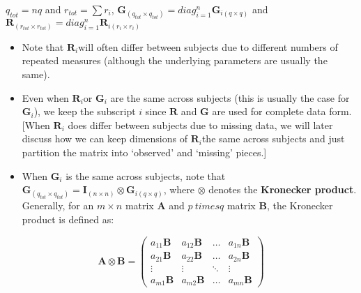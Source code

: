\documentclass[
  9pt,
  ignorenonframetext,
]{beamer}
\begin{document}
\begin{frame}{}
\(q_{tot} = nq\) and \(r_{tot} = \sum r_i\),
\(\pmb G_{(q_{tot} \times q_{tot})} = diag_{i=1}^n \pmb G_{i (q \times q)}\)
and
\(\pmb R_{(r_{tot} \times r_{tot})} = diag_{i=1}^n \pmb R_{i (r_i \times r_i)}\)
\end{frame}

\begin{frame}{}
\protect\hypertarget{section-3}{}
\begin{itemize}
\item
  Note that \(\pmb R_i\)will often differ between subjects due to
  different numbers of repeated measures (although the underlying
  parameters are usually the same).
\item
  Even when \(\pmb R_i\)or \(\pmb G_i\) are the same across subjects
  (this is usually the case for \(\pmb G_i\)), we keep the subscript
  \(i\) since \(\pmb R\) and \(\pmb G\) are used for complete data form.
  {[}When \(\pmb R_i\) does differ between subjects due to missing data,
  we will later discuss how we can keep dimensions of \(\pmb R_i\)the
  same across subjects and just partition the matrix into `observed' and
  `missing' pieces.{]}
\item
  When \(\pmb G_i\) is the same across subjects, note that
  \(\pmb G_{(q_{tot} \times q_{tot})} = \pmb I_{(n\times n)} \otimes \pmb G_{i(q \times q)}\),
  where \(\otimes\) denotes the \textbf{Kronecker product}. Generally,
  for an \(m \times n\) matrix \(\pmb A\) and \(p \ times q\) matrix
  \(\pmb B\), the Kronecker product is defined as:
\end{itemize}

\[
\pmb  A \otimes \pmb B = 
\begin{pmatrix}
a_{11} \pmb B & a_{12} \pmb B & \dots & a_{1n} \pmb B\\ 
a_{21} \pmb B & a_{22} \pmb B & \dots & a_{2n} \pmb B\\ 
\vdots & \vdots & \ddots & \vdots\\ 
a_{m1} \pmb B & a_{m2} \pmb B & \dots & a_{mn} \pmb B
\end{pmatrix}
\]
\end{frame}
\end{document}
